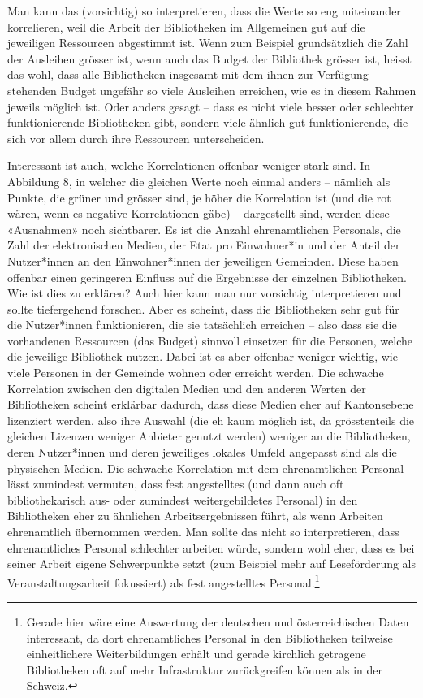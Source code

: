 \documentclass[a4paper,
fontsize=11pt,
oneside,
numbers=noperiodatend,
parskip=half-,
bibliography=totoc,
final
]{scrartcl}
\begin{document}
Man kann das (vorsichtig) so interpretieren, dass die Werte so eng
miteinander korrelieren, weil die Arbeit der Bibliotheken im Allgemeinen
gut auf die jeweiligen Ressourcen abgestimmt ist. Wenn zum Beispiel
grundsätzlich die Zahl der Ausleihen grösser ist, wenn auch das Budget
der Bibliothek grösser ist, heisst das wohl, dass alle Bibliotheken
insgesamt mit dem ihnen zur Verfügung stehenden Budget ungefähr so viele
Ausleihen erreichen, wie es in diesem Rahmen jeweils möglich ist. Oder
anders gesagt -- dass es nicht viele besser oder schlechter
funktionierende Bibliotheken gibt, sondern viele ähnlich gut
funktionierende, die sich vor allem durch ihre Ressourcen unterscheiden.

Interessant ist auch, welche Korrelationen offenbar weniger stark sind.
In Abbildung 8, in welcher die gleichen Werte noch einmal anders --
nämlich als Punkte, die grüner und grösser sind, je höher die
Korrelation ist (und die rot wären, wenn es negative Korrelationen gäbe)
-- dargestellt sind, werden diese «Ausnahmen» noch sichtbarer. Es ist
die Anzahl ehrenamtlichen Personals, die Zahl der elektronischen Medien,
der Etat pro Einwohner*in und der Anteil der Nutzer*innen an den
Einwohner*innen der jeweiligen Gemeinden. Diese haben offenbar einen
geringeren Einfluss auf die Ergebnisse der einzelnen Bibliotheken. Wie
ist dies zu erklären? Auch hier kann man nur vorsichtig interpretieren
und sollte tiefergehend forschen. Aber es scheint, dass die Bibliotheken
sehr gut für die Nutzer*innen funktionieren, die sie tatsächlich
erreichen -- also dass sie die vorhandenen Ressourcen (das Budget)
sinnvoll einsetzen für die Personen, welche die jeweilige Bibliothek
nutzen. Dabei ist es aber offenbar weniger wichtig, wie viele Personen
in der Gemeinde wohnen oder erreicht werden. Die schwache Korrelation
zwischen den digitalen Medien und den anderen Werten der Bibliotheken
scheint erklärbar dadurch, dass diese Medien eher auf Kantonsebene
lizenziert werden, also ihre Auswahl (die eh kaum möglich ist, da
grösstenteils die gleichen Lizenzen weniger Anbieter genutzt werden)
weniger an die Bibliotheken, deren Nutzer*innen und deren jeweiliges
lokales Umfeld angepasst sind als die physischen Medien. Die schwache
Korrelation mit dem ehrenamtlichen Personal lässt zumindest vermuten,
dass fest angestelltes (und dann auch oft bibliothekarisch aus- oder
zumindest weitergebildetes Personal) in den Bibliotheken eher zu
ähnlichen Arbeitsergebnissen führt, als wenn Arbeiten ehrenamtlich
übernommen werden. Man sollte das nicht so interpretieren, dass
ehrenamtliches Personal schlechter arbeiten würde, sondern wohl eher,
dass es bei seiner Arbeit eigene Schwerpunkte setzt (zum Beispiel mehr
auf Leseförderung als Veranstaltungsarbeit fokussiert) als fest
angestelltes Personal.\footnote{Gerade hier wäre eine Auswertung der
  deutschen und österreichischen Daten interessant, da dort
  ehrenamtliches Personal in den Bibliotheken teilweise einheitlichere
  Weiterbildungen erhält und gerade kirchlich getragene Bibliotheken oft
  auf mehr Infrastruktur zurückgreifen können als in der Schweiz.}
\end{document}
